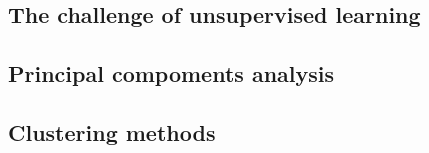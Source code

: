 \subsection{The challenge of unsupervised learning}

\subsection{Principal compoments analysis}

\subsection{Clustering methods}

%
%
%
%
